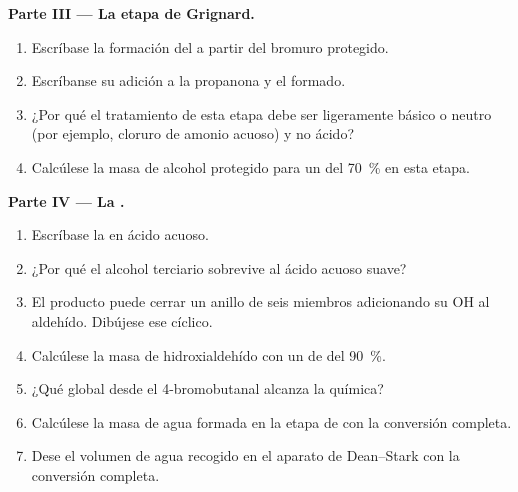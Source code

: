 \begin{problem}
\medskip
\noindent\textbf{Parte III --- La etapa de Grignard.}
\begin{enumerate}[resume]
  \item Escríbase la formación del  a partir del
        bromuro protegido.
  \item Escríbanse su adición a la propanona y el  formado.
  \item ¿Por qué el tratamiento de esta etapa debe ser ligeramente básico
        o neutro (por ejemplo, cloruro de amonio acuoso) y no ácido?
  \item Calcúlese la masa de alcohol protegido para un  del
        \qty{70}{\percent} en esta etapa.
\end{enumerate}

\medskip
\noindent\textbf{Parte IV --- La .}
\begin{enumerate}[resume]
  \item Escríbase la  en ácido acuoso.
  \item ¿Por qué el alcohol terciario sobrevive al ácido acuoso suave?
  \item El producto puede cerrar un anillo de seis miembros adicionando su
        OH al aldehído. Dibújese ese  cíclico.
  \item Calcúlese la masa de hidroxialdehído con un  de
         del \qty{90}{\percent}.
  \item ¿Qué  global desde el 4-bromobutanal alcanza la
        química?
  \item Calcúlese la masa de agua formada en la etapa de  con la
        conversión completa.
  \item Dese el volumen de agua recogido en el aparato de Dean--Stark con
        la conversión completa.
\end{enumerate}
\end{problem}
